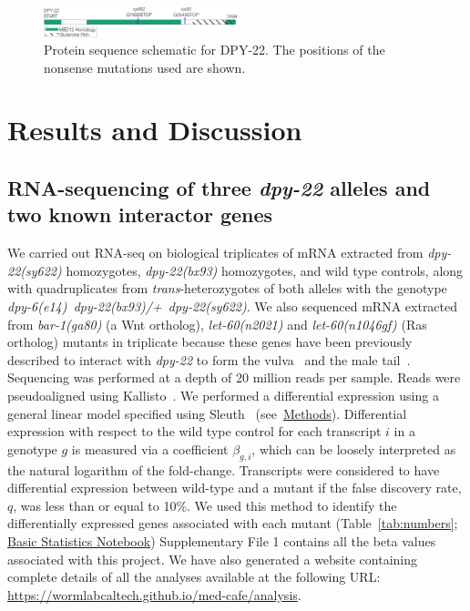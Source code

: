 \documentclass[9pt,twocolumn,twoside]{gsajnl}
\newcommand{\gene}[1]{\mbox{\emph{#1}}}
\newcommand{\protein}[1]{\mbox{\uppercase{#1}}}
\newcommand{\dpy}[1]{\gene{dpy-22#1}}
\newcommand{\bx}{\dpy{(bx93)}}
\newcommand{\sy}{\dpy{(sy622)}}
\begin{document}
\begin{figure}
  \centering{}
  \includegraphics[width=0.5\textwidth]{../figs/Gene_Model.pdf}
  \caption{
           Protein sequence schematic for \protein{dpy-22}. The positions of the
           nonsense mutations used are shown.
           }
\label{fig:genemodel}
\end{figure}


\section*{Results and Discussion}
\subsection*{RNA-sequencing of three \gene{dpy-22} alleles and two known
             interactor genes}
We carried out RNA-seq on biological triplicates of mRNA extracted from \sy{}
homozygotes, \bx{} homozygotes, and wild type controls, along with
quadruplicates from \emph{trans}-heterozygotes of both alleles with the genotype
\gene{dpy-6(e14) dpy-22(bx93)/+ dpy-22(sy622)}. We also sequenced mRNA extracted
from \gene{bar-1(ga80)} (a Wnt ortholog), \gene{let-60(n2021)} and
\gene{let-60(n1046gf)} (Ras ortholog) mutants in triplicate because these genes
have been previously described to interact with \dpy{} to form the
vulva~\citep{Moghal2003} and the male tail~\citep{Zhang2000}. Sequencing was
performed at a depth of 20 million reads per sample. Reads were pseudoaligned
using Kallisto~\citep{Bray2016}. We performed a differential expression using a
general linear model specified using Sleuth~\citep{Pimentel2016a}
(see~\hyperref[sec:methods]{Methods}). Differential expression with respect to
the wild type control for each transcript $i$ in a genotype $g$ is measured via
a coefficient $\beta_{g, i}$, which can be loosely interpreted as the natural
logarithm of the fold-change. Transcripts were considered to have differential
expression between wild-type and a mutant if the false discovery rate, $q$, was
less than or equal to 10\%. We used this method to identify the differentially
expressed genes associated with each mutant (Table~\ref{tab:numbers};
\href{https://wormlabcaltech.github.io/med-cafe/notebook/basic.html}{Basic
Statistics Notebook}) Supplementary File 1 contains all the beta values
associated with this project. We have also generated a website containing
complete details of all the analyses available at the following URL:\@
\url{https://wormlabcaltech.github.io/med-cafe/analysis}.
\end{document}
